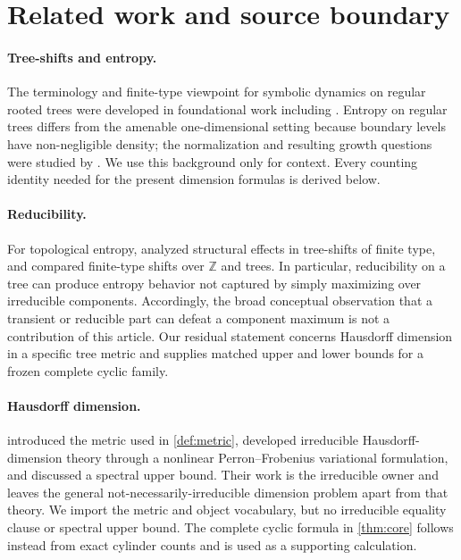 \section{Related work and source boundary}
\label{sec:related}

\paragraph{Tree-shifts and entropy.}
The terminology and finite-type viewpoint for symbolic dynamics on regular
rooted trees were developed in foundational work including
\citet{aubrunBeal2012}.  Entropy on regular trees differs from the amenable
one-dimensional setting because boundary levels have non-negligible density;
the normalization and resulting growth questions were studied by
\citet{petersenSalama2018,petersenSalama2020}.  We use this background only
for context.  Every counting identity needed for the present dimension
formulas is derived below.

\paragraph{Reducibility.}
For topological entropy, \citet{banEtAl2021} analyzed structural effects in
tree-shifts of finite type, and \citet{banEtAl2022} compared finite-type shifts
over $\mathbb Z$ and trees.  In particular, reducibility on a tree can produce
entropy behavior not captured by simply maximizing over irreducible
components.  Accordingly, the broad conceptual observation that a transient
or reducible part can defeat a component maximum is not a contribution of this
article.  Our residual statement concerns Hausdorff dimension in a specific
tree metric and supplies matched upper and lower bounds for a frozen complete
cyclic family.

\paragraph{Hausdorff dimension.}
\citet{banLaiWu2025} introduced the metric used in
\cref{def:metric}, developed irreducible Hausdorff-dimension theory through a
nonlinear Perron--Frobenius variational formulation, and discussed a spectral
upper bound.  Their work is the irreducible owner and leaves the general
not-necessarily-irreducible dimension problem apart from that theory.  We
import the metric and object vocabulary, but no irreducible equality clause or
spectral upper bound.  The complete cyclic formula in
\cref{thm:core} follows instead from exact cylinder counts and is used as a
supporting calculation.

